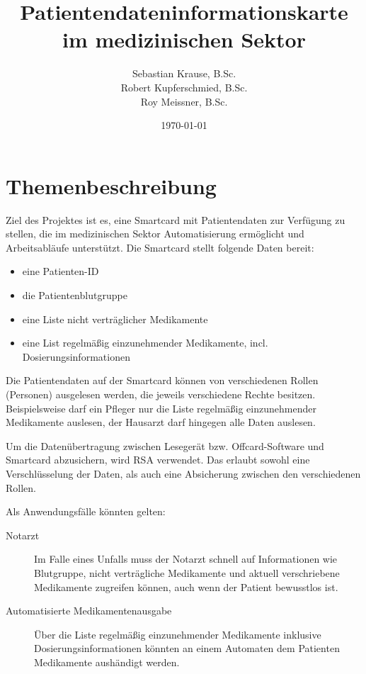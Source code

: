 \documentclass[parskip]{scrartcl}
\begin{document}
	\subject{Projektdokumentation im Fach Smartcard-Programmierung}
	\title{Patientendateninformationskarte im medizinischen Sektor}
	\author{Sebastian Krause, B.Sc.\\Robert Kupferschmied, B.Sc.\\Roy Meissner, B.Sc.}
	\date{\today}
	
	\maketitle
	\vspace{\fill}
	\tableofcontents
	\newpage
	
	\section{Themenbeschreibung}
		Ziel des Projektes ist es, eine Smartcard mit Patientendaten zur Verfügung zu stellen, die im medizinischen Sektor Automatisierung ermöglicht und Arbeitsabläufe unterstützt. Die Smartcard stellt folgende Daten bereit:

		\begin{itemize}
			\item eine Patienten-ID
			\item die Patientenblutgruppe
			\item eine Liste nicht verträglicher Medikamente
			\item eine List regelmäßig einzunehmender Medikamente, incl. Dosierungsinformationen
		\end{itemize}
			
		Die Patientendaten auf der Smartcard können von verschiedenen Rollen (Personen) ausgelesen werden, die jeweils verschiedene Rechte besitzen. Beispielsweise darf ein Pfleger nur die Liste regelmäßig einzunehmender Medikamente auslesen, der Hausarzt darf hingegen alle Daten auslesen.
		
		
		Um die Datenübertragung zwischen Lesegerät bzw. Offcard-Software und Smartcard abzusichern, wird RSA verwendet. Das erlaubt sowohl eine Verschlüsselung der Daten, als auch eine Absicherung zwischen den verschiedenen Rollen. 
		
		Als Anwendungsfälle könnten gelten:
	
		\begin{description}
			\item[Notarzt] Im Falle eines Unfalls muss der Notarzt schnell auf Informationen wie Blutgruppe, nicht verträgliche Medikamente und aktuell verschriebene Medikamente zugreifen können, auch wenn der Patient bewusstlos ist. 
			\item[Automatisierte Medikamentenausgabe] Über die Liste regelmäßig einzunehmender Medikamente inklusive Dosierungsinformationen könnten an einem Automaten dem Patienten Medikamente aushändigt werden.
		\end{description}
	
\end{document}
